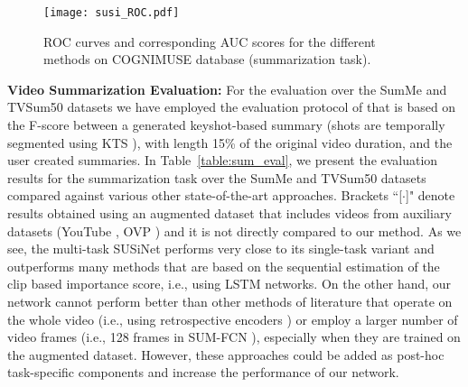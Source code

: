 \documentclass[10pt,twocolumn,letterpaper]{article}
\begin{document}
\begin{figure}[t]
\begin{center}
\hspace{-1cm}
\texttt{[image: susi\_ROC.pdf]}
\end{center}
\vspace{-0.4cm}
   \caption{ROC curves and corresponding AUC scores for the different methods on \mbox{COGNIMUSE} database (summarization task).}
\label{fig:roc_cogn}
\vspace{-0.3cm}
\end{figure}

\noindent\textbf{Video Summarization Evaluation:} For the evaluation over the SumMe and TVSum50 datasets we have employed the evaluation protocol of \cite{zhang2016video} that is based on the F-score between a generated keyshot-based summary (shots are temporally segmented using KTS \cite{potapov2014category}), with length 15\% of the original video duration, and the user created summaries. In Table~\ref{table:sum_eval}, we present the evaluation results for the summarization task over the SumMe and TVSum50 datasets compared against various other state-of-the-art approaches. Brackets ``[$\cdot$]" denote results obtained using an augmented dataset that includes videos from auxiliary datasets (YouTube \cite{de2011vsumm}, OVP \cite{de2011vsumm,ovp}) and it is not directly compared to our method. As we see, the multi-task SUSiNet performs very close to its single-task variant and outperforms many methods that are based on the sequential estimation of the clip based importance score, i.e., using LSTM networks. On the other hand, our network cannot perform better than other methods of  literature that operate on the whole video (i.e., using retrospective encoders \cite{zhang2018retrospective}) or employ a larger number of video frames (i.e., 128 frames in SUM-FCN \cite{rochan2018video}), especially when they are trained on the augmented dataset. However, these approaches could be added as post-hoc task-specific components and increase the performance of our network.
\end{document}
